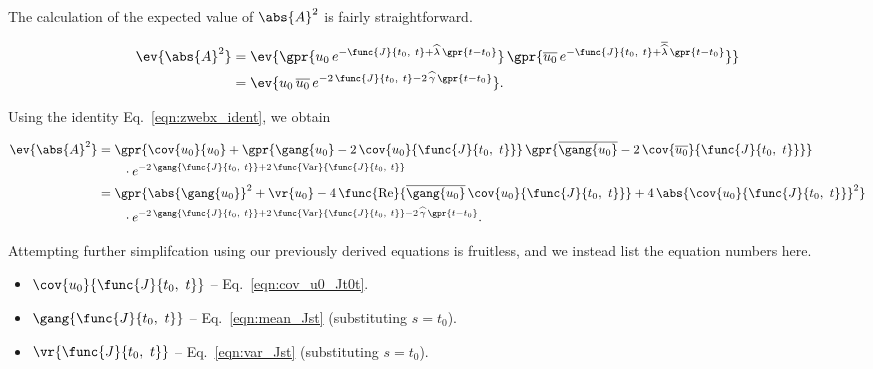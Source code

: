 The calculation of the expected value of $\abs{A}^2$ is fairly straightforward.

\begin{align}
    \ev{\abs{A}^2} &= \ev{\gpr{u_0\,e^{-\func{J}{t_0,\ t} + \widehat{\lambda}\,\gpr{t - t_0}}}\,\gpr{\overline{u_0}\,e^{-\func{J}{t_0,\ t} + \overline{\widehat{\lambda}}\,\gpr{t - t_0}}}} \nonumber \\
    	&= \ev{u_0\,\overline{u_0}\,e^{-2\,\func{J}{t_0,\ t} - 2\,\widehat{\gamma}\,\gpr{t - t_0}}}.
\end{align}

Using the identity Eq.~\ref{eqn:zwebx_ident}, we obtain

\begin{align}
    \ev{\abs{A}^2} &= \gpr{\cov{u_0}{u_0} + \gpr{\gang{u_0} - 2\,\cov{u_0}{\func{J}{t_0,\ t}}}\,\gpr{\overline{\gang{u_0}} - 2\,\cov{\overline{u_0}}{\func{J}{t_0,\ t}}}} \nonumber \\
    		&\qquad \cdot e^{-2\,\gang{\func{J}{t_0,\ t}} + 2\,\func{\text{Var}}{\func{J}{t_0,\ t}}} \nonumber \\
    	&= \gpr{\abs{\gang{u_0}}^2 + \vr{u_0} - 4\,\func{\text{Re}}{\overline{\gang{u_0}}\,\cov{u_0}{\func{J}{t_0,\ t}}} + 4\,\abs{\cov{u_0}{\func{J}{t_0,\ t}}}^2} \nonumber \\
    		&\qquad \cdot e^{-2\,\gang{\func{J}{t_0,\ t}} + 2\,\func{\text{Var}}{\func{J}{t_0,\ t}} - 2\,\widehat{\gamma}\,\gpr{t - t_0}}. \label{eqn:mean_absA2}
\end{align}

Attempting further simplifcation using our previously derived equations is fruitless, and we instead list the equation numbers here.

\begin{itemize}
	\item [] $\cov{u_0}{\func{J}{t_0,\ t}}$ -- Eq.~\ref{eqn:cov_u0_Jt0t}.
	\item [] $\gang{\func{J}{t_0,\ t}}$ -- Eq.~\ref{eqn:mean_Jst} (substituting $s = t_0$).
	\item [] $\vr{\func{J}{t_0,\ t}}$ -- Eq.~\ref{eqn:var_Jst} (substituting $s = t_0$).
\end{itemize}

